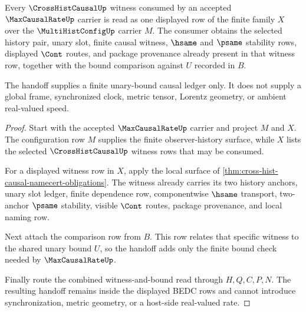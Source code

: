 \begin{theorem}
\label{thm:max-causal-rate-crosshist-handoff}
Every $\CrossHistCausalUp$ witness consumed by an accepted $\MaxCausalRateUp$ carrier is read as one displayed row of the finite family $X$ over the $\MultiHistConfigUp$ carrier $M$. The consumer obtains the selected history pair, unary slot, finite causal witness, $\hsame$ and $\psame$ stability rows, displayed $\Cont$ routes, and package provenance already present in that witness row, together with the bound comparison against $U$ recorded in $B$.

The handoff supplies a finite unary-bound causal ledger only. It does not supply a global frame, synchronized clock, metric tensor, Lorentz geometry, or ambient real-valued speed.
\end{theorem}
\begin{proof}
Start with the accepted $\MaxCausalRateUp$ carrier and project $M$ and $X$. The configuration row $M$ supplies the finite observer-history surface, while $X$ lists the selected $\CrossHistCausalUp$ witness rows that may be consumed.

For a displayed witness row in $X$, apply the local surface of \autoref{thm:cross-hist-causal-namecert-obligations}. The witness already carries its two history anchors, unary slot ledger, finite dependence row, componentwise $\hsame$ transport, two-anchor $\psame$ stability, visible $\Cont$ routes, package provenance, and local naming row.

Next attach the comparison row from $B$. This row relates that specific witness to the shared unary bound $U$, so the handoff adds only the finite bound check needed by $\MaxCausalRateUp$.

Finally route the combined witness-and-bound read through $H,Q,C,P,N$. The resulting handoff remains inside the displayed BEDC rows and cannot introduce synchronization, metric geometry, or a host-side real-valued rate.
\end{proof}

